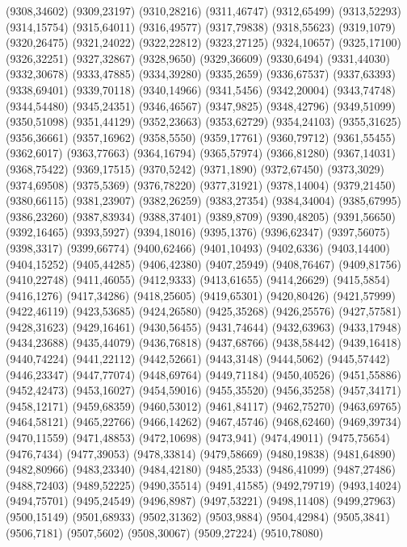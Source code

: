 (9308,34602)
(9309,23197)
(9310,28216)
(9311,46747)
(9312,65499)
(9313,52293)
(9314,15754)
(9315,64011)
(9316,49577)
(9317,79838)
(9318,55623)
(9319,1079)
(9320,26475)
(9321,24022)
(9322,22812)
(9323,27125)
(9324,10657)
(9325,17100)
(9326,32251)
(9327,32867)
(9328,9650)
(9329,36609)
(9330,6494)
(9331,44030)
(9332,30678)
(9333,47885)
(9334,39280)
(9335,2659)
(9336,67537)
(9337,63393)
(9338,69401)
(9339,70118)
(9340,14966)
(9341,5456)
(9342,20004)
(9343,74748)
(9344,54480)
(9345,24351)
(9346,46567)
(9347,9825)
(9348,42796)
(9349,51099)
(9350,51098)
(9351,44129)
(9352,23663)
(9353,62729)
(9354,24103)
(9355,31625)
(9356,36661)
(9357,16962)
(9358,5550)
(9359,17761)
(9360,79712)
(9361,55455)
(9362,6017)
(9363,77663)
(9364,16794)
(9365,57974)
(9366,81280)
(9367,14031)
(9368,75422)
(9369,17515)
(9370,5242)
(9371,1890)
(9372,67450)
(9373,3029)
(9374,69508)
(9375,5369)
(9376,78220)
(9377,31921)
(9378,14004)
(9379,21450)
(9380,66115)
(9381,23907)
(9382,26259)
(9383,27354)
(9384,34004)
(9385,67995)
(9386,23260)
(9387,83934)
(9388,37401)
(9389,8709)
(9390,48205)
(9391,56650)
(9392,16465)
(9393,5927)
(9394,18016)
(9395,1376)
(9396,62347)
(9397,56075)
(9398,3317)
(9399,66774)
(9400,62466)
(9401,10493)
(9402,6336)
(9403,14400)
(9404,15252)
(9405,44285)
(9406,42380)
(9407,25949)
(9408,76467)
(9409,81756)
(9410,22748)
(9411,46055)
(9412,9333)
(9413,61655)
(9414,26629)
(9415,5854)
(9416,1276)
(9417,34286)
(9418,25605)
(9419,65301)
(9420,80426)
(9421,57999)
(9422,46119)
(9423,53685)
(9424,26580)
(9425,35268)
(9426,25576)
(9427,57581)
(9428,31623)
(9429,16461)
(9430,56455)
(9431,74644)
(9432,63963)
(9433,17948)
(9434,23688)
(9435,44079)
(9436,76818)
(9437,68766)
(9438,58442)
(9439,16418)
(9440,74224)
(9441,22112)
(9442,52661)
(9443,3148)
(9444,5062)
(9445,57442)
(9446,23347)
(9447,77074)
(9448,69764)
(9449,71184)
(9450,40526)
(9451,55886)
(9452,42473)
(9453,16027)
(9454,59016)
(9455,35520)
(9456,35258)
(9457,34171)
(9458,12171)
(9459,68359)
(9460,53012)
(9461,84117)
(9462,75270)
(9463,69765)
(9464,58121)
(9465,22766)
(9466,14262)
(9467,45746)
(9468,62460)
(9469,39734)
(9470,11559)
(9471,48853)
(9472,10698)
(9473,941)
(9474,49011)
(9475,75654)
(9476,7434)
(9477,39053)
(9478,33814)
(9479,58669)
(9480,19838)
(9481,64890)
(9482,80966)
(9483,23340)
(9484,42180)
(9485,2533)
(9486,41099)
(9487,27486)
(9488,72403)
(9489,52225)
(9490,35514)
(9491,41585)
(9492,79719)
(9493,14024)
(9494,75701)
(9495,24549)
(9496,8987)
(9497,53221)
(9498,11408)
(9499,27963)
(9500,15149)
(9501,68933)
(9502,31362)
(9503,9884)
(9504,42984)
(9505,3841)
(9506,7181)
(9507,5602)
(9508,30067)
(9509,27224)
(9510,78080)
